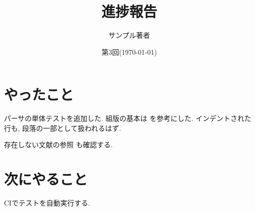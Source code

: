 \documentclass[a4paper,twocolumn]{jsarticle}
\title{進捗報告}
\date{第3回(\today)}%
\author{サンプル著者}
\begin{document}
\maketitle

\section{やったこと}
パーサの単体テストを追加した.
組版の基本は \cite{knuth} を参考にした.
	インデントされた行も, 段落の一部として扱われるはず\cite{lamport,knuth}.

存在しない文献の参照 \cite{missing} も確認する.

\section{次にやること}
CIでテストを自動実行する.




\end{document}
